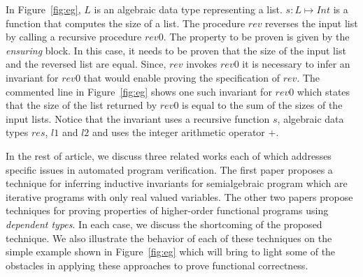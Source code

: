 %
In Figure~\ref{fig:eg}, $L$ is an algebraic data type representing a list. $s: L \mapsto Int$ is a function 
that computes the size of a list. The procedure $rev$ reverses the input list by calling a recursive procedure 
$rev0$. The property to be proven is given by the \emph{ensuring} block. In this case, it needs to be proven
that the size of the input list and the reversed list are equal. Since, $rev$ invokes $rev0$ it is necessary to 
infer an invariant for $rev0$ that would enable proving the specification of $rev$. 
The commented line in Figure~\ref{fig:eg} shows one such invariant for $rev0$ which states that
the size of the list returned by $rev0$ is equal to the sum of the sizes of the input lists.
Notice that the invariant uses a recursive function $s$, algebraic data types $res$, $l1$ and $l2$
and uses the integer arithmetic operator $+$.

In the rest of article, we discuss three related works each of which addresses specific issues in
automated program verification. The first paper proposes a technique for inferring inductive invariants
for semialgebraic program which are iterative programs with only real valued variables. The other two 
papers propose techniques for proving properties of higher-order functional programs using \emph{dependent types}.
In each case, we discuss the shortcoming of the proposed technique. 
We also illustrate the behavior of each of these techniques on the simple example shown 
in Figure~\ref{fig:eg} which will bring to light some of the obstacles 
in applying these approaches to prove functional correctness.